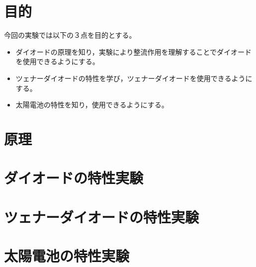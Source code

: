 \documentclass[11pt,dvipdfmx]{jarticle}
\begin{document}

\section{目的}
今回の実験では以下の３点を目的とする。
\begin{itemize}
	\item ダイオードの原理を知り，実験により整流作用を理解することでダイオードを使用できるようにする。
	\item ツェナーダイオードの特性を学び，ツェナーダイオードを使用できるようにする。
	\item 太陽電池の特性を知り，使用できるようにする。
\end{itemize}

\section{原理}


\section{ダイオードの特性実験}

\newpage
\section{ツェナーダイオードの特性実験}

\section{太陽電池の特性実験}


\end{document}
